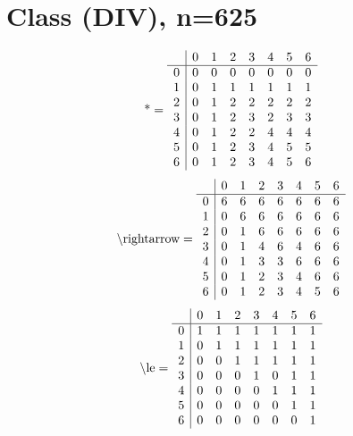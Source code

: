 \documentclass[11pt]{article}
\begin{document}
\section{Class (DIV), n=625}
\[\text{*} = 
\begin{array}{r | r r r r r r r}
 & 0 & 1 & 2 & 3 & 4 & 5 & 6 \\ \hline
0 & 0 & 0 & 0 & 0 & 0 & 0 & 0 \\
1 & 0 & 1 & 1 & 1 & 1 & 1 & 1 \\
2 & 0 & 1 & 2 & 2 & 2 & 2 & 2 \\
3 & 0 & 1 & 2 & 3 & 2 & 3 & 3 \\
4 & 0 & 1 & 2 & 2 & 4 & 4 & 4 \\
5 & 0 & 1 & 2 & 3 & 4 & 5 & 5 \\
6 & 0 & 1 & 2 & 3 & 4 & 5 & 6 \\
\end{array}
\]
\[\text{\textbackslash rightarrow} = 
\begin{array}{r | r r r r r r r}
 & 0 & 1 & 2 & 3 & 4 & 5 & 6 \\ \hline
0 & 6 & 6 & 6 & 6 & 6 & 6 & 6 \\
1 & 0 & 6 & 6 & 6 & 6 & 6 & 6 \\
2 & 0 & 1 & 6 & 6 & 6 & 6 & 6 \\
3 & 0 & 1 & 4 & 6 & 4 & 6 & 6 \\
4 & 0 & 1 & 3 & 3 & 6 & 6 & 6 \\
5 & 0 & 1 & 2 & 3 & 4 & 6 & 6 \\
6 & 0 & 1 & 2 & 3 & 4 & 5 & 6 \\
\end{array}
\]
\[\text{\textbackslash le} = 
\begin{array}{r | r r r r r r r}
 & 0 & 1 & 2 & 3 & 4 & 5 & 6 \\ \hline
0 & 1 & 1 & 1 & 1 & 1 & 1 & 1 \\
1 & 0 & 1 & 1 & 1 & 1 & 1 & 1 \\
2 & 0 & 0 & 1 & 1 & 1 & 1 & 1 \\
3 & 0 & 0 & 0 & 1 & 0 & 1 & 1 \\
4 & 0 & 0 & 0 & 0 & 1 & 1 & 1 \\
5 & 0 & 0 & 0 & 0 & 0 & 1 & 1 \\
6 & 0 & 0 & 0 & 0 & 0 & 0 & 1 \\
\end{array}
\]
\end{document}
